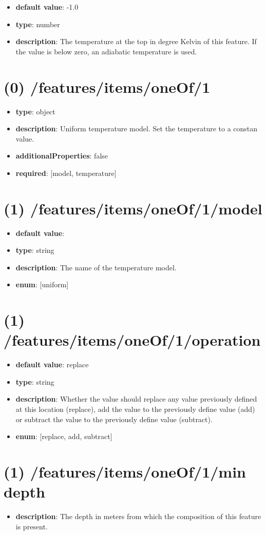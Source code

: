 \begin{itemize}[leftmargin=0em]\item {\bf default value}: -1.0
\item {\bf type}: number
\item {\bf description}: The temperature at the top in degree Kelvin of this feature. If the value is below zero, an adiabatic temperature is used.
\end{itemize}\section{(0) /features/items/oneOf/1}
\begin{itemize}[leftmargin=0em]\item {\bf type}: object
\item {\bf description}: Uniform temperature model. Set the temperature to a constan value.
\item {\bf additionalProperties}: false
\item {\bf required}: [model, temperature]\end{itemize}
\section{(1) /features/items/oneOf/1/model}
\begin{itemize}[leftmargin=1em]\item {\bf default value}: 
\item {\bf type}: string
\item {\bf description}: The name of the temperature model.
\item {\bf enum}: [uniform]\end{itemize}\section{(1) /features/items/oneOf/1/operation}
\begin{itemize}[leftmargin=1em]\item {\bf default value}: replace
\item {\bf type}: string
\item {\bf description}: Whether the value should replace any value previously defined at this location (replace), add the value to the previously define value (add) or subtract the value to the previously define value (subtract).
\item {\bf enum}: [replace, add, subtract]\end{itemize}\section{(1) /features/items/oneOf/1/min depth}
\begin{itemize}[leftmargin=1em]\item {\bf description}: The depth in meters from which the composition of this feature is present.
\end{itemize}

